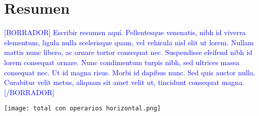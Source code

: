 
\newpage
\clearpage{\pagestyle{empty}\cleardoublepage}
\newpage

\pagestyle{empty}
\newpage
\chapter*{\centering \large Resumen} 





\textcolor{blue}{[BORRADOR] Escribir resumen aquí. Pellentesque venenatis, nibh id viverra elementum, ligula nulla scelerisque quam, vel vehicula nisl elit ut lorem. Nullam mattis nunc libero, ac ornare tortor consequat nec. Suspendisse eleifend nibh id lorem consequat ornare. Nunc condimentum turpis nibh, sed ultrices massa consequat nec. Ut id magna risus. Morbi id dapibus nunc. Sed quis auctor nulla. Curabitur velit metus, aliquam sit amet velit ut, tincidunt consequat magna. [/BORRADOR]}

\newpage

\begin{myfigure}[H]
	\footnotesize\centering
	\texttt{[image: total con operarios horizontal.png]}
\end{myfigure}
